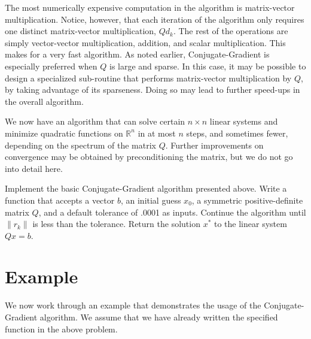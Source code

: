 The most numerically expensive computation in the algorithm is matrix-vector multiplication.
Notice, however, that each iteration of the algorithm only requires one distinct matrix-vector multiplication, $Qd_k$. The rest of the
operations are simply vector-vector multiplication, addition, and scalar multiplication. This makes for a very fast algorithm.
As noted earlier, Conjugate-Gradient is especially preferred when $Q$ is large and sparse. In this case, it may be possible to
design a specialized sub-routine that performs matrix-vector multiplication by $Q$, by taking advantage of its sparseness. Doing so may
lead to further speed-ups in the overall algorithm.

We now have an algorithm that can solve certain $n \times n$ linear systems and minimize quadratic functions on $\mathbb{R}^n$ in at most $n$ steps,
and sometimes fewer, depending on the spectrum of the matrix $Q$. Further improvements on convergence may be obtained by preconditioning the matrix,
but we do not go into detail here.

\begin{problem}
Implement the basic Conjugate-Gradient algorithm presented above.
Write a function  that accepts a vector $b$, an initial
guess $x_0$, a symmetric positive-definite matrix $Q$, and a default tolerance of .0001 as inputs.
Continue the algorithm until $\|r_k\|$ is less than the tolerance.
Return the solution $x^*$ to the linear system $Qx = b$.
\end{problem}

\section*{Example}
We now work through an example that demonstrates the usage of the Conjugate-Gradient algorithm. We assume that we have already written
the specified function in the above problem.

